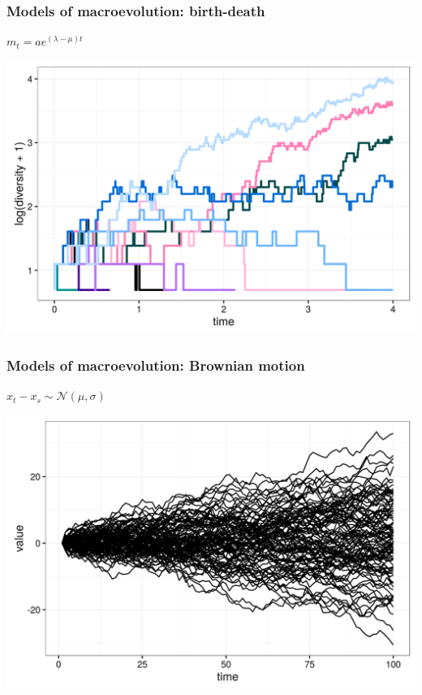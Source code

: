 \documentclass{beamer}
\begin{document}
\begin{frame}
  \frametitle{Models of macroevolution: birth-death}
  
  \begin{center}
    \(m_{t} = a e^{(\lambda - \mu) t}\)

    \includegraphics[width = \textwidth,height = 0.8\textheight,keepaspectratio = true]{figure/bd_sim}
  \end{center}

\end{frame}

\begin{frame}
  \frametitle{Models of macroevolution: Brownian motion}

  \begin{center}
    \(x_{t} - x_{s} \sim \mathcal{N}(\mu, \sigma)\)

    \includegraphics[width = \textwidth,height = 0.8\textheight,keepaspectratio = true]{figure/brown_sim}
  \end{center}

\end{frame}
\end{document}
